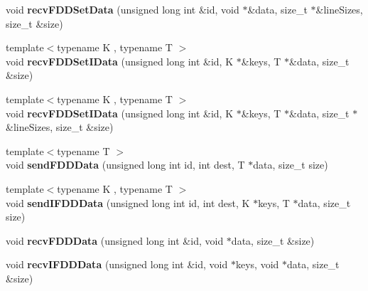 \begin{DoxyCompactItemize}
\item 
\hypertarget{classfaster_1_1fastComm_abe5fb47fb54ef8bea608eec1ccbbcae6}{}void {\bfseries recv\+F\+D\+D\+Set\+Data} (unsigned long int \&id, void $\ast$\&data, size\+\_\+t $\ast$\&line\+Sizes, size\+\_\+t \&size)\label{classfaster_1_1fastComm_abe5fb47fb54ef8bea608eec1ccbbcae6}

\item 
\hypertarget{classfaster_1_1fastComm_ae234c6735666e85789aafc82120c0f0f}{}{\footnotesize template$<$typename K , typename T $>$ }\\void {\bfseries recv\+F\+D\+D\+Set\+I\+Data} (unsigned long int \&id, K $\ast$\&keys, T $\ast$\&data, size\+\_\+t \&size)\label{classfaster_1_1fastComm_ae234c6735666e85789aafc82120c0f0f}

\item 
\hypertarget{classfaster_1_1fastComm_a5f9da47ecd49c3456777bec1815c0600}{}{\footnotesize template$<$typename K , typename T $>$ }\\void {\bfseries recv\+F\+D\+D\+Set\+I\+Data} (unsigned long int \&id, K $\ast$\&keys, T $\ast$\&data, size\+\_\+t $\ast$\&line\+Sizes, size\+\_\+t \&size)\label{classfaster_1_1fastComm_a5f9da47ecd49c3456777bec1815c0600}

\item 
\hypertarget{classfaster_1_1fastComm_a0b67f926ff07626bec61c04fe3da36ef}{}{\footnotesize template$<$typename T $>$ }\\void {\bfseries send\+F\+D\+D\+Data} (unsigned long int id, int dest, T $\ast$data, size\+\_\+t size)\label{classfaster_1_1fastComm_a0b67f926ff07626bec61c04fe3da36ef}

\item 
\hypertarget{classfaster_1_1fastComm_aa26227cfe5edb65b68b9e0198ae69e94}{}{\footnotesize template$<$typename K , typename T $>$ }\\void {\bfseries send\+I\+F\+D\+D\+Data} (unsigned long int id, int dest, K $\ast$keys, T $\ast$data, size\+\_\+t size)\label{classfaster_1_1fastComm_aa26227cfe5edb65b68b9e0198ae69e94}

\item 
\hypertarget{classfaster_1_1fastComm_af880244a1924f6647f8c2d40a59853ef}{}void {\bfseries recv\+F\+D\+D\+Data} (unsigned long int \&id, void $\ast$data, size\+\_\+t \&size)\label{classfaster_1_1fastComm_af880244a1924f6647f8c2d40a59853ef}

\item 
\hypertarget{classfaster_1_1fastComm_a34a8ad79fda6a1146df90a13c14b95a3}{}void {\bfseries recv\+I\+F\+D\+D\+Data} (unsigned long int \&id, void $\ast$keys, void $\ast$data, size\+\_\+t \&size)\label{classfaster_1_1fastComm_a34a8ad79fda6a1146df90a13c14b95a3}


\end{DoxyCompactItemize}
